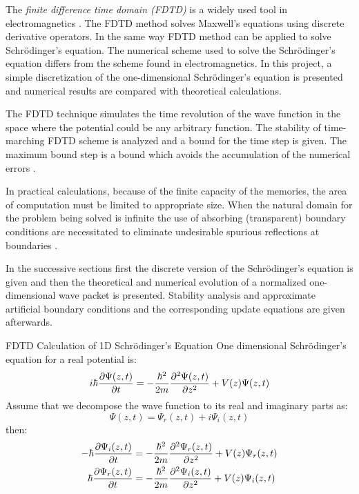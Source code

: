 \begin{homeworkProblem}
The \textit{finite difference time domain (FDTD)} is a widely used tool in electromagnetics \cite{taflove}. The FDTD method solves Maxwell's equations using discrete derivative operators. In the same way FDTD method can be applied to solve Schr\"odinger's equation. The numerical scheme used to solve the Schr\"odinger's equation differs from the scheme found in electromagnetics. In this project, a simple discretization of the one-dimensional Schr\"odinger's equation is presented and numerical results are compared with theoretical calculations. 

The FDTD technique simulates the time revolution of the wave function in the space where the potential could be any arbitrary function. The stability of time-marching FDTD scheme is analyzed and a bound for the time step is given. The maximum bound step is a bound which avoids the accumulation of the numerical errors \cite{antonio004}.

 In practical calculations, because of the finite capacity of the memories, the area of computation must be limited to appropriate size.  When the natural domain for the problem being solved is infinite the use of absorbing (transparent) boundary conditions are necessitated to eliminate undesirable spurious reflections at boundaries \cite{shibata,kosloff}. 

In the successive sections first the discrete version of the Schr\"odinger's equation is given and then the theoretical and numerical evolution of a normalized one-dimensional wave packet is presented. Stability analysis and approximate artificial boundary conditions and the corresponding update equations are given afterwards. 
\begin{homeworkSection}{\normalsize FDTD Calculation of 1D Schr\"odinger's Equation}
One dimensional Schr\"odinger's equation for a real potential is:
\begin{equation}
i\hbar\dfrac{\partial \Psi(z,t)}{\partial t}=-\frac{\hbar^2}{2m}\dfrac{\partial^2 {\Psi(z,t)}}{\partial {z}^2}+V(z)\Psi(z,t)
\end{equation}
Assume that we decompose the wave function to its real and imaginary parts as:
$$\Psi(z,t)=\Psi_r(z,t)+i\Psi_i(z,t)$$
then:
\begin{align}
-\hbar\dfrac{\partial \Psi_i(z,t)}{\partial t}&=-\frac{\hbar^2}{2m}\dfrac{\partial^2 {\Psi_r(z,t)}}{\partial {z}^2}+V(z)\Psi_r(z,t)\label{P5-real}\\
\hbar\dfrac{\partial \Psi_r(z,t)}{\partial t}&=-\frac{\hbar^2}{2m}\dfrac{\partial^2 {\Psi_i(z,t)}}{\partial {z}^2}+V(z)\Psi_i(z,t)\label{P5-imag}
\end{align}


\end{homeworkSection}
\end{homeworkProblem}

